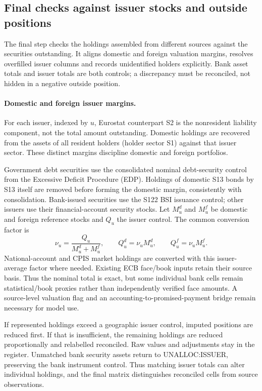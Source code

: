 \subsection{Final checks against issuer stocks and outside positions}
\label{app:row}

The final step checks the holdings assembled from different sources against the securities outstanding. It aligns domestic and foreign valuation margins, resolves overfilled issuer columns and records unidentified holders explicitly. Bank asset totals and issuer totals are both controls; a discrepancy must be reconciled, not hidden in a negative outside position.

\paragraph{Domestic and foreign issuer margins.}
For each issuer, indexed by $u$, Eurostat counterpart S2 is the nonresident liability component, not the total amount outstanding. Domestic holdings are recovered from the assets of all resident holders (holder sector S1) against that issuer sector. These distinct margins discipline domestic and foreign portfolios.

Government debt securities use the consolidated nominal debt-security control from the Excessive Deficit Procedure (EDP). Holdings of domestic S13 bonds by S13 itself are removed before forming the domestic margin, consistently with consolidation. Bank-issued securities use the S122 BSI issuance control; other issuers use their financial-account security stocks. Let $M_u^d$ and $M_u^f$ be domestic and foreign reference stocks and $Q_u$ the issuer control. The common conversion factor is
\begin{equation}
 \nu_u=\frac{Q_u}{M_u^d+M_u^f},
 \qquad Q_u^d=\nu_u M_u^d,\qquad Q_u^f=\nu_u M_u^f.
 \label{eq:issuer-valuation}
\end{equation}
National-account and CPIS market holdings are converted with this issuer-average factor where needed. Existing ECB face/book inputs retain their source basis. Thus the nominal total is exact, but some individual bank cells remain statistical/book proxies rather than independently verified face amounts. A source-level valuation flag and an accounting-to-promised-payment bridge remain necessary for model use.

If represented holdings exceed a geographic issuer control, imputed positions are reduced first. If that is insufficient, the remaining holdings are reduced proportionally and relabelled reconciled. Raw values and adjustments stay in the register. Unmatched bank security assets return to UNALLOC:ISSUER, preserving the bank instrument control. Thus matching issuer totals can alter individual holdings, and the final matrix distinguishes reconciled cells from source observations.

